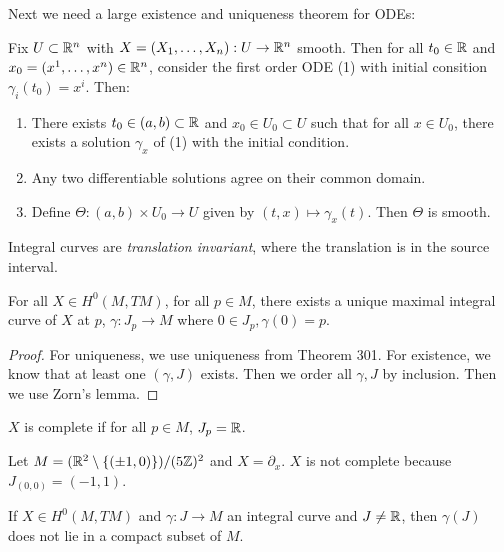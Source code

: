 \documentclass[twoside, 10pt]{article}
\begin{document}
    Next we need a large existence and uniqueness theorem for ODEs: \begin{thm}
        Fix $U \subset \mathbb{R}^n$ with $X = (X_1, \ldots, X_n):U \to \mathbb{R}^n$ smooth.
        Then for all $t_0 \in \mathbb{R}$ and $x_0 = (x^1, \ldots, x^n) \in \mathbb{R}^n$,
        consider the first order ODE (1) with initial consition $\gamma_i(t_0)
        = x^i$. Then: \begin{enumerate} \item There exists $t_0 \in (a,b)
            \subset \mathbb{R}$ and $x_0 \in U_0 \subset U$ such that for all $x \in
            U_0$, there exists a solution $\gamma_x$ of (1) with the initial
            condition.  \item Any two differentiable solutions agree on their
            common domain.  \item Define $\Theta: (a,b) \times U_0 \to U$ given
    by $(t,x) \mapsto \gamma_x(t)$. Then $\Theta$ is smooth.  \end{enumerate}
\end{thm}
    
    \begin{rmk} Integral curves are \textit{translation invariant}, where the
    translation is in the source interval.  \end{rmk}

    \begin{lem} For all $X \in H^0(M, TM)$, for all $p \in M$, there exists a
    unique maximal integral curve of $X$ at $p$, $\gamma: J_p \to M$ where $0
\in J_p, \gamma(0) = p$.  \end{lem}

    \begin{proof} For uniqueness, we use uniqueness from Theorem 301. For
    existence, we know that at least one $(\gamma, J)$ exists. Then we order
all $\gamma, J$ by inclusion. Then we use Zorn's lemma.  \end{proof}

    \begin{defn} $X$ is complete if for all $p \in M$, $J_p = \mathbb{R}$.  \end{defn}

    \begin{exm} Let $M = ( \mathbb{R}^2 \setminus \{(\pm 1, 0) \} ) / (5\mathbb{Z})^2$ and $X =
    \partial_x$. $X$ is not complete because $J_{(0,0)} = (-1,1)$.  \end{exm}

    \begin{lem} If $X \in H^0(M, TM)$ and $\gamma:J \to M$ an
    integral curve and $J \neq \mathbb{R}$, then $\gamma(J)$ does not lie in a compact
subset of $M$.  \end{lem}
\end{document}
